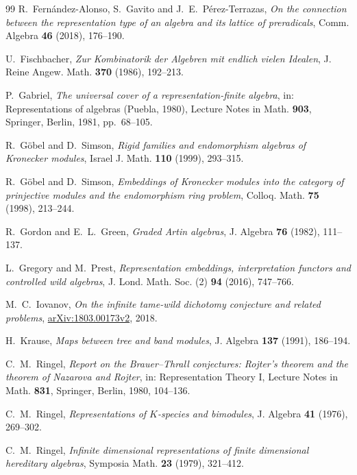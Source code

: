 \documentclass[a4paper,reqno,10pt]{amsart}
\theoremstyle{definition}
\numberwithin{equation}{section}
\begin{document}
\begin{thebibliography}{99}
R.~Fern\'andez-Alonso, S.~Gavito and J.~E.~P\'erez-Terrazas,
\emph{On the connection between the representation type of an algebra and
its lattice of preradicals},
Comm. Algebra \textbf{46} (2018), 176--190.

U.~Fischbacher,
\emph{Zur Kombinatorik der Algebren mit endlich vielen Idealen},
J. Reine Angew. Math. \textbf{370} (1986), 192--213.

P.~Gabriel,
\emph{The universal cover of a representation-finite algebra},
in: Representations of algebras (Puebla, 1980), Lecture Notes in Math.
\textbf{903}, Springer, Berlin, 1981, pp.~68--105.

R.~G\"obel and D.~Simson,
\emph{Rigid families and endomorphism algebras of Kronecker modules},
Israel J. Math. \textbf{110} (1999), 293--315.

R.~G\"obel and D.~Simson,
\emph{Embeddings of Kronecker modules into the category of prinjective
modules and the endomorphism ring problem},
Colloq. Math. \textbf{75} (1998), 213--244.

R.~Gordon and E.~L.~Green,
\emph{Graded Artin algebras},
J. Algebra \textbf{76} (1982), 111--137.

L.~Gregory and M.~Prest,
\emph{Representation embeddings, interpretation functors and controlled
wild algebras},
J. Lond. Math. Soc. (2) \textbf{94} (2016), 747--766.

M.~C.~Iovanov,
\emph{On the infinite tame-wild dichotomy conjecture and related problems},
\href{https://arxiv.org/abs/1803.00173v2}{arXiv:1803.00173v2}, 2018.

H.~Krause,
\emph{Maps between tree and band modules},
J. Algebra \textbf{137} (1991), 186--194.

C.~M.~Ringel,
\emph{Report on the Brauer--Thrall conjectures: Rojter's theorem and the
theorem of Nazarova and Rojter},
in: Representation Theory I, Lecture Notes in Math. \textbf{831},
Springer, Berlin, 1980, 104--136.

C.~M.~Ringel,
\emph{Representations of $K$-species and bimodules},
J. Algebra \textbf{41} (1976), 269--302.

C.~M.~Ringel,
\emph{Infinite dimensional representations of finite dimensional
hereditary algebras},
Symposia Math. \textbf{23} (1979), 321--412.


\end{thebibliography}
\end{document}
